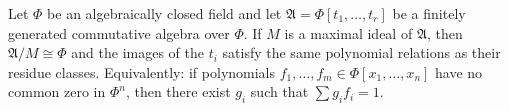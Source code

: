 Let $\Phi$ be an algebraically closed field and let $\mathfrak{A} = \Phi[t_1, \ldots, t_r]$ be a finitely generated commutative algebra over $\Phi$. If $M$ is a maximal ideal of $\mathfrak{A}$, then $\mathfrak{A}/M \cong \Phi$ and the images of the $t_i$ satisfy the same polynomial relations as their residue classes. Equivalently: if polynomials $f_1, \ldots, f_m \in \Phi[x_1, \ldots, x_n]$ have no common zero in $\Phi^n$, then there exist $g_i$ such that $\sum g_i f_i = 1$.
